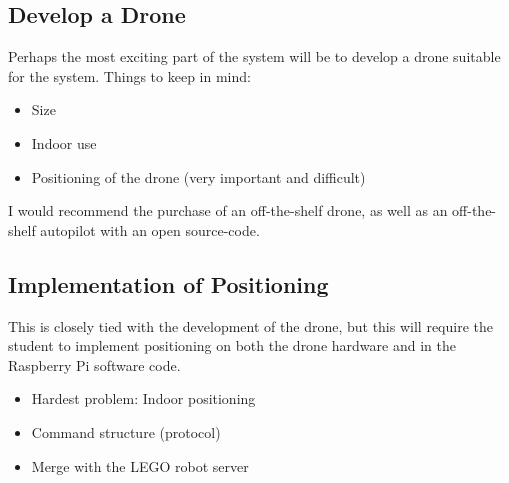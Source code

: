 \subsection{Develop a Drone}
Perhaps the most exciting part of the system will be to develop a drone suitable for the system. Things to keep in mind:
\begin{itemize}
\item Size
\item Indoor use
\item Positioning of the drone (very important and difficult)
\end{itemize}

I would recommend the purchase of an off-the-shelf drone, as well as an off-the-shelf autopilot with an open source-code. 

\subsection{Implementation of Positioning}
This is closely tied with the development of the drone, but this will require the student to implement positioning on both the drone hardware and in the Raspberry Pi software code.
\begin{itemize}
\item Hardest problem: Indoor positioning
\item Command structure (protocol)
\item Merge with the LEGO robot server
\end{itemize}






